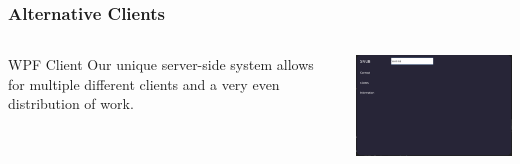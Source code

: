 \documentclass[aspectratio=169]{beamer}
\begin{document}
\begin{frame}
    \frametitle{Alternative Clients}

    \begin{columns}
        \begin{column}{0.38\textwidth}
            \begin{block}{WPF Client}
                Our unique server-side system allows for multiple different clients and a very even distribution of work.
            \end{block}
        \end{column}
        \begin{column}{0.58\textwidth}
            \includegraphics[width=9cm]{WpfBluePrint.png}
        \end{column}
    \end{columns}
\end{frame}
\end{document}
